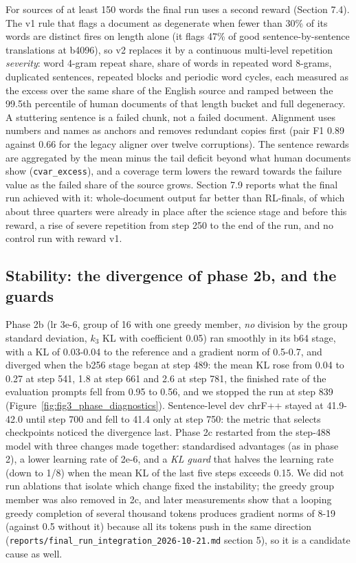 For sources of at least 150 words the final run uses a second reward (Section 7.4). The v1 rule that flags a document as degenerate when fewer than 30\% of its words are distinct fires on length alone (it flags 47\% of good sentence-by-sentence translations at b4096), so v2 replaces it by a continuous multi-level repetition \emph{severity}: word 4-gram repeat share, share of words in repeated word 8-grams, duplicated sentences, repeated blocks and periodic word cycles, each measured as the excess over the same share of the English source and ramped between the 99.5th percentile of human documents of that length bucket and full degeneracy. A stuttering sentence is a failed chunk, not a failed document. Alignment uses numbers and names as anchors and removes redundant copies first (pair F1 0.89 against 0.66 for the legacy aligner over twelve corruptions). The sentence rewards are aggregated by the mean minus the tail deficit beyond what human documents show (\texttt{cvar\_excess}), and a coverage term lowers the reward towards the failure value as the failed share of the source grows. Section 7.9 reports what the final run achieved with it: whole-document output far better than RL-final\textquotesingle s, of which about three quarters were already in place after the science stage and before this reward, a rise of severe repetition from step 250 to the end of the run, and no control run with reward v1.

\subsection{Stability: the divergence of phase 2b, and the guards}\label{stability-the-divergence-of-phase-2b-and-the-guards}

Phase 2b (lr 3e-6, group of 16 with one greedy member, \emph{no} division by the group standard deviation, \(k_3\) KL with coefficient 0.05) ran smoothly in its b64 stage, with a KL of 0.03-0.04 to the reference and a gradient norm of 0.5-0.7, and diverged when the b256 stage began at step 489: the mean KL rose from 0.04 to 0.27 at step 541, 1.8 at step 661 and 2.6 at step 781, the finished rate of the evaluation prompts fell from 0.95 to 0.56, and we stopped the run at step 839 (Figure~\ref{fig:fig3_phase_diagnostics}). Sentence-level dev chrF++ stayed at 41.9-42.0 until step 700 and fell to 41.4 only at step 750: the metric that selects checkpoints noticed the divergence last. Phase 2c restarted from the step-488 model with three changes made together: standardised advantages (as in phase 2), a lower learning rate of 2e-6, and a \emph{KL guard} that halves the learning rate (down to 1/8) when the mean KL of the last five steps exceeds 0.15. We did not run ablations that isolate which change fixed the instability; the greedy group member was also removed in 2c, and later measurements show that a looping greedy completion of several thousand tokens produces gradient norms of 8-19 (against 0.5 without it) because all its tokens push in the same direction (\texttt{reports/final\_run\_integration\_2026-10-21.md} section 5), so it is a candidate cause as well.

